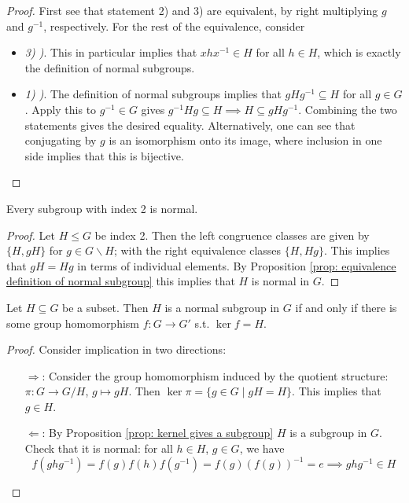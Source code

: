 \begin{proof}
    First see that statement 2) and 3) are equivalent, by right multiplying $g$ and $g^{-1}$, respectively. For the rest of the equivalence, consider
    \begin{itemize}
        \item \emph{3) )}. This in particular implies that $xhx^{-1} \in H$ for all $h \in H$, which is exactly the definition of normal subgroups.
        \item \emph{1) )}. The definition of normal subgroups implies that $gHg^{-1} \subseteq H$ for all $g \in G$. Apply this to $g^{-1} \in G$ gives $g^{-1} H g \subseteq H \implies H \subseteq gHg^{-1}$. Combining the two statements gives the desired equality. Alternatively, one can see that conjugating by $g$ is an isomorphism onto its image, where inclusion in one side implies that this is bijective. 
    \end{itemize}
\end{proof}

\begin{corollary}
    Every subgroup with index 2 is normal.
\end{corollary}

\begin{proof}
    Let $H \leq G$ be index 2. Then the left congruence classes are given by $\{ H, gH \}$ for $g \in G \smallsetminus H$; with the right equivalence classes $\{ H, Hg \}$. This implies that $gH = Hg$ in terms of individual elements. By Proposition \ref{prop: equivalence definition of normal subgroup} this implies that $H$ is normal in $G$. 
\end{proof}

\begin{proposition}\label{prop: kernel gives a normal subgroup}
    Let $H \subseteq G$ be a subset. Then $H$ is a normal subgroup in $G$ if and only if there is some group homomorphism $f: G \to G'$ s.t. $\ker f = H$.
\end{proposition}

\begin{proof}
    Consider implication in two directions:
    \begin{enumerate}
        \item[$\Rightarrow$:] Consider the group homomorphism induced by the quotient structure: $\pi: G \to G/H$, $g \mapsto gH$. Then $\ker \pi = \{ g \in G \mid gH = H \}$. This implies that $g \in H$.
        \item[$\Leftarrow$:] By Proposition \ref{prop: kernel gives a subgroup} $H$ is a subgroup in $G$. Check that it is normal: for all $h \in H$, $g \in G$, we have
        \[
            f(ghg^{-1}) = f(g) f(h) f(g^{-1}) = f(g) (f(g))^{-1} = e \implies ghg^{-1} \in H
        \]
    \end{enumerate}
\end{proof}

